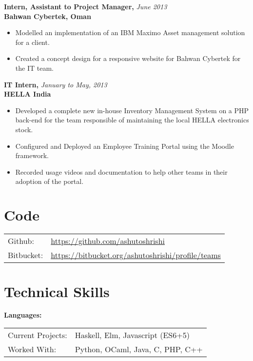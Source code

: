 \documentclass[a4paper,overlapped]{res}
\begin{document}
\begin{resume}
  \textbf{Intern, Assistant to Project Manager,}  \hfill \textit{June 2013}\\
  \textbf{Bahwan Cybertek, Oman}
  \begin{itemize}
  \item Modelled an implementation of an IBM Maximo Asset management 
    solution for a client. 
  \item Created a concept design for a responsive website for Bahwan Cybertek 
    for the IT team. 
  \end{itemize}

  \textbf{IT Intern,} \hfill \textit{January to May, 2013}\\
  \textbf{HELLA India}
  \begin{itemize}
  \item Developed a complete new in-house Inventory Management System on a PHP
    back-end for the team responsible of maintaining the local HELLA electronics stock.
  \item Configured and Deployed an Employee Training Portal using the
    Moodle framework.
  \item Recorded usage videos and documentation to help other teams in their
    adoption of the portal.
  \end{itemize}


  \section{Code}
  \begin{tabular}{l l}
    Github:    & \url{https://github.com/ashutoshrishi} \\
    Bitbucket: & \url{https://bitbucket.org/ashutoshrishi/profile/teams}
  \end{tabular}
  

  \section{Technical Skills} 
  \textbf{Languages:} \\ 
  \begin{tabular}{l l}
    Current Projects: & Haskell, Elm, Javascript (ES6+5) \\ 
    Worked With: & Python, OCaml, Java, C, PHP, C++ \\
  \end{tabular}\\


\end{resume}
\end{document}
